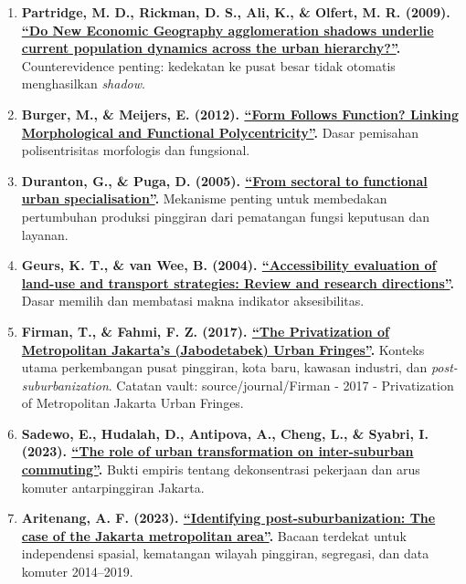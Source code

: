 \documentclass[
  indonesian,
  11pt,
  a4paper,
  oneside,
  openany]{report}
\begin{document}
\begin{enumerate}
{{{  Theory and Under-developed Regions}}.} Landasan \emph{spread effects},
  \emph{backwash effects}, dan kausasi kumulatif. Catatan vault:
  source/book/Myrdal - 1957 - Economic Theory and Under-Developed
  Regions.
\item
  \textbf{Partridge, M. D., Rickman, D. S., Ali, K., \& Olfert, M. R.
  (2009). \href{https://doi.org/10.1111/j.1435-5957.2008.00211.x}{``Do
  New Economic Geography agglomeration shadows underlie current
  population dynamics across the urban hierarchy?''}.} Counterevidence
  penting: kedekatan ke pusat besar tidak otomatis menghasilkan
  \emph{shadow}.
\item
  \textbf{Burger, M., \& Meijers, E. (2012).
  \href{https://doi.org/10.1177/0042098011407095}{``Form Follows
  Function? Linking Morphological and Functional Polycentricity''}.}
  Dasar pemisahan polisentrisitas morfologis dan fungsional.
\item
  \textbf{Duranton, G., \& Puga, D. (2005).
  \href{https://doi.org/10.1016/j.jue.2004.12.002}{``From sectoral to
  functional urban specialisation''}.} Mekanisme penting untuk
  membedakan pertumbuhan produksi pinggiran dari pematangan fungsi
  keputusan dan layanan.
\item
  \textbf{Geurs, K. T., \& van Wee, B. (2004).
  \href{https://doi.org/10.1016/j.jtrangeo.2003.10.005}{``Accessibility
  evaluation of land-use and transport strategies: Review and research
  directions''}.} Dasar memilih dan membatasi makna indikator
  aksesibilitas.
\item
  \textbf{Firman, T., \& Fahmi, F. Z. (2017).
  \href{https://doi.org/10.1080/01944363.2016.1249010}{``The
  Privatization of Metropolitan Jakarta's (Jabodetabek) Urban
  Fringes''}.} Konteks utama perkembangan pusat pinggiran, kota baru,
  kawasan industri, dan \emph{post-suburbanization}. Catatan vault:
  source/journal/Firman - 2017 - Privatization of Metropolitan Jakarta
  Urban Fringes.
\item
  \textbf{Sadewo, E., Hudalah, D., Antipova, A., Cheng, L., \& Syabri,
  I. (2023). \href{https://doi.org/10.1080/02723638.2022.2125649}{``The
  role of urban transformation on inter-suburban commuting''}.} Bukti
  empiris tentang dekonsentrasi pekerjaan dan arus komuter
  antarpinggiran Jakarta.
\item
  \textbf{Aritenang, A. F. (2023).
  \href{https://doi.org/10.1016/j.habitatint.2023.102857}{``Identifying
  post-suburbanization: The case of the Jakarta metropolitan area''}.}
  Bacaan terdekat untuk independensi spasial, kematangan wilayah
  pinggiran, segregasi, dan data komuter 2014--2019.
\end{enumerate}
\end{document}
